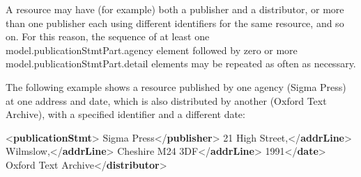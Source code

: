 A resource may have (for example) both a publisher and a distributor, or more than one publisher each using different identifiers for the same resource, and so on. For this reason, the sequence of at least one \textsf{model.publicationStmtPart.agency} element followed by zero or more \textsf{model.publicationStmtPart.detail} elements may be repeated as often as necessary.\par
The following example shows a resource published by one agency (Sigma Press) at one address and date, which is also distributed by another (Oxford Text Archive), with a specified identifier and a different date: \par\bgroup{}\exampleFont \begin{shaded}\noindent\mbox{}{<\textbf{publicationStmt}>}\mbox{}\newline 
{}Sigma Press{</\textbf{publisher}>}\mbox{}\newline 
{}\mbox{}\newline 
\hspace*{1em}21 High Street,{</\textbf{addrLine}>}\mbox{}\newline 
\hspace*{1em}Wilmslow,{</\textbf{addrLine}>}\mbox{}\newline 
\hspace*{1em}Cheshire M24 3DF{</\textbf{addrLine}>}\mbox{}\newline 
{}\mbox{}\newline 
{}1991{</\textbf{date}>}\mbox{}\newline 
{}Oxford Text Archive{</\textbf{distributor}>}\mbox{}\newline 

\end{shaded}
